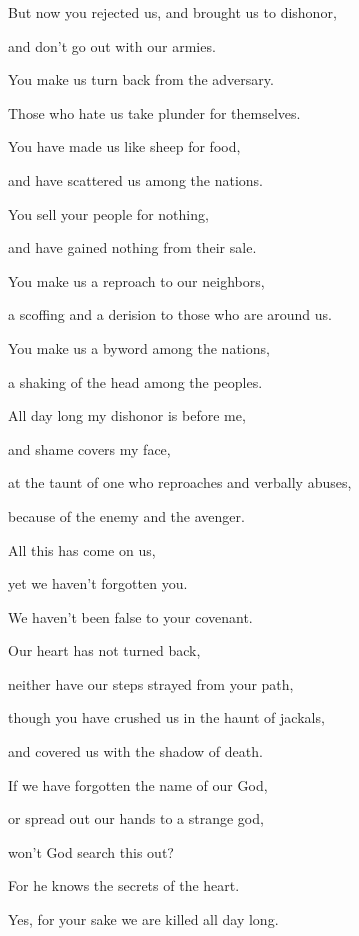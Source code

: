 {\BB \par }{\Q {}But now you rejected us, and brought us to dishonor,
\par }{\QB and don’t go out with our armies.
\par }{\Q {}You make us turn back from the adversary.
\par }{\QB Those who hate us take plunder for themselves.
\par }{\Q {}You have made us like sheep for food,
\par }{\QB and have scattered us among the nations.
\par }{\Q {}You sell your people for nothing,
\par }{\QB and have gained nothing from their sale.
\par }{\Q {}You make us a reproach to our neighbors,
\par }{\QB a scoffing and a derision to those who are around us.
\par }{\Q {}You make us a byword among the nations,
\par }{\QB a shaking of the head among the peoples.
\par }{\Q {}All day long my dishonor is before me,
\par }{\QB and shame covers my face,
\par }{\QB {}at the taunt of one who reproaches and verbally abuses,
\par }{\QB because of the enemy and the avenger.
\par }{\Q {}All this has come on us,
\par }{\QB yet we haven’t forgotten you.
\par }{\QB We haven’t been false to your covenant.
\par }{\Q {}Our heart has not turned back,
\par }{\QB neither have our steps strayed from your path,
\par }{\QB {}though you have crushed us in the haunt of jackals,
\par }{\QB and covered us with the shadow of death.
\par }{\Q {}If we have forgotten the name of our God,
\par }{\QB or spread out our hands to a strange god,
\par }{\QB {}won’t God search this out?
\par }{\QB For he knows the secrets of the heart.
\par }{\Q {}Yes, for your sake we are killed all day long.
}
